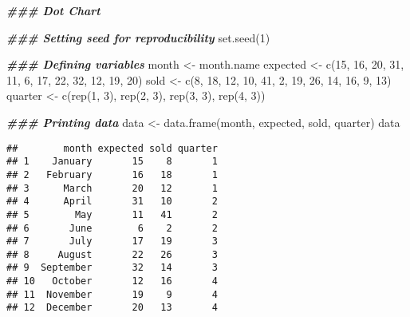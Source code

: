 \documentclass[
]{article}
\newenvironment{Shaded}{\begin{snugshade}}{\end{snugshade}}
\newcommand{\DecValTok}[1]{\textcolor[rgb]{0.00,0.00,0.81}{#1}}
\newcommand{\DocumentationTok}[1]{\textcolor[rgb]{0.56,0.35,0.01}{\textbf{\textit{#1}}}}
\newcommand{\FunctionTok}[1]{\textcolor[rgb]{0.00,0.00,0.00}{#1}}
\newcommand{\NormalTok}[1]{#1}
\newcommand{\OtherTok}[1]{\textcolor[rgb]{0.56,0.35,0.01}{#1}}
\begin{document}
\begin{Shaded}
\begin{Highlighting}[]
\DocumentationTok{\#\#\# Dot Chart}

\DocumentationTok{\#\#\# Setting seed for reproducibility}
\FunctionTok{set.seed}\NormalTok{(}\DecValTok{1}\NormalTok{)}

\DocumentationTok{\#\#\# Defining variables}
\NormalTok{month }\OtherTok{\textless{}{-}}\NormalTok{ month.name}
\NormalTok{expected }\OtherTok{\textless{}{-}} \FunctionTok{c}\NormalTok{(}\DecValTok{15}\NormalTok{, }\DecValTok{16}\NormalTok{, }\DecValTok{20}\NormalTok{, }\DecValTok{31}\NormalTok{, }\DecValTok{11}\NormalTok{, }\DecValTok{6}\NormalTok{,}
              \DecValTok{17}\NormalTok{, }\DecValTok{22}\NormalTok{, }\DecValTok{32}\NormalTok{, }\DecValTok{12}\NormalTok{, }\DecValTok{19}\NormalTok{, }\DecValTok{20}\NormalTok{)}
\NormalTok{sold }\OtherTok{\textless{}{-}} \FunctionTok{c}\NormalTok{(}\DecValTok{8}\NormalTok{, }\DecValTok{18}\NormalTok{, }\DecValTok{12}\NormalTok{, }\DecValTok{10}\NormalTok{, }\DecValTok{41}\NormalTok{, }\DecValTok{2}\NormalTok{,}
          \DecValTok{19}\NormalTok{, }\DecValTok{26}\NormalTok{, }\DecValTok{14}\NormalTok{, }\DecValTok{16}\NormalTok{, }\DecValTok{9}\NormalTok{, }\DecValTok{13}\NormalTok{)}
\NormalTok{quarter }\OtherTok{\textless{}{-}} \FunctionTok{c}\NormalTok{(}\FunctionTok{rep}\NormalTok{(}\DecValTok{1}\NormalTok{, }\DecValTok{3}\NormalTok{), }\FunctionTok{rep}\NormalTok{(}\DecValTok{2}\NormalTok{, }\DecValTok{3}\NormalTok{), }\FunctionTok{rep}\NormalTok{(}\DecValTok{3}\NormalTok{, }\DecValTok{3}\NormalTok{), }\FunctionTok{rep}\NormalTok{(}\DecValTok{4}\NormalTok{, }\DecValTok{3}\NormalTok{))}

\DocumentationTok{\#\#\# Printing data}
\NormalTok{data }\OtherTok{\textless{}{-}} \FunctionTok{data.frame}\NormalTok{(month, expected, sold, quarter)}
\NormalTok{data}
\end{Highlighting}
\end{Shaded}

\begin{verbatim}
##        month expected sold quarter
## 1    January       15    8       1
## 2   February       16   18       1
## 3      March       20   12       1
## 4      April       31   10       2
## 5        May       11   41       2
## 6       June        6    2       2
## 7       July       17   19       3
## 8     August       22   26       3
## 9  September       32   14       3
## 10   October       12   16       4
## 11  November       19    9       4
## 12  December       20   13       4
\end{verbatim}
\end{document}
